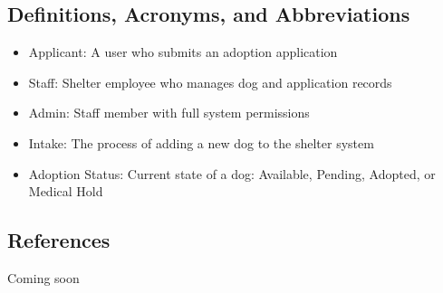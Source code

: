 \documentclass[12pt]{article}
\begin{document}
\subsection{Definitions, Acronyms, and Abbreviations}
\begin{itemize}\item Applicant: A user who submits an adoption application\end{itemize}
\begin{itemize}\item Staff: Shelter employee who manages dog and application records\end{itemize}
\begin{itemize}\item Admin: Staff member with full system permissions\end{itemize}
\begin{itemize}\item Intake: The process of adding a new dog to the shelter system\end{itemize}
\begin{itemize}\item Adoption Status: Current state of a dog: Available, Pending, Adopted, or Medical Hold\end{itemize}
\subsection{References}
Coming soon
\end{document}
